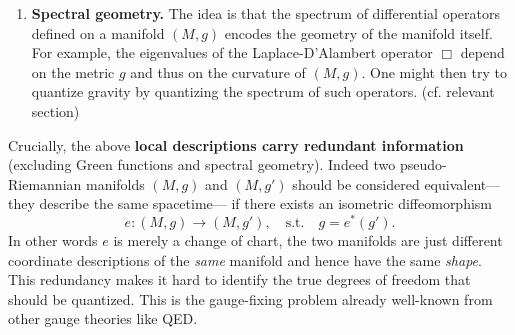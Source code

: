 \begin{mytheorem}
\begin{enumerate}
where \(\Box\) is the D'Alambert operator associated to the metric \(g\).
From the knowledge of the Green function \(G(x,y)\) for all pairs of points \((x,y) \in M \times M\), one might try to reconstruct the metric \(g\) and thus the curvature of the manifold. 
In doing so, quantization conditions on $g$ might emerge naturally from the quantum nature of the field theory itself.
%
\item \textbf{Spectral geometry.} The idea is that the spectrum of differential operators defined on a manifold \((M,g)\) encodes the geometry of the manifold itself.
For example, the eigenvalues of the Laplace-D'Alambert operator \(\Box\) depend on the metric \(g\) and thus on the curvature of \((M,g)\).
One might then try to quantize gravity by quantizing the spectrum of such operators. (cf. relevant section) 
\end{enumerate}
%
Crucially, the above \textbf{local descriptions carry redundant information}  (excluding Green functions and spectral geometry).
Indeed two pseudo-Riemannian manifolds \((M,g)\) and \((M,g')\) should be considered equivalent— they describe the same spacetime— if there exists an isometric diffeomorphism
\[
e:(M,g)\longrightarrow (M,g'), \quad \text{s.t.}\quad g = e^*(g').
\]
In other words \(e\) is merely a change of chart, the two manifolds are just different coordinate descriptions of the \emph{same} manifold and hence have the same \emph{shape}.
This redundancy makes it hard to identify the true degrees of freedom that should be quantized.
This is the gauge-fixing problem already well-known from other gauge theories like QED.
%
\end{mytheorem}



